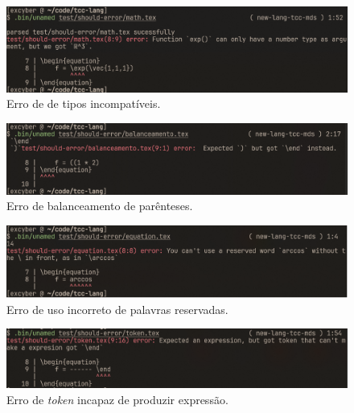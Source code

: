 \begin{figure}[H]
    \caption{\label{error-incompatible-types} \small Erro de de tipos incompatíveis.}
    \begin{center}
        \includegraphics[scale=0.5]{./Imagens/error-incompatible-types.png}
    \end{center}
\end{figure}


\begin{figure}[H]
    \caption{\label{error-balanceamento} \small Erro de balanceamento de parênteses.}
    \begin{center}
        \includegraphics[scale=0.5]{./Imagens/error-balanceamento.png}
    \end{center}
\end{figure}

\begin{figure}[H]
    \caption{\label{error-reserved-word} \small Erro de uso incorreto de palavras reservadas.}
    \begin{center}
        \includegraphics[scale=0.5]{./Imagens/error-reserved-word.png}
    \end{center}
\end{figure}


\begin{figure}[H]
    \caption{\label{error-cant-make-expression} \small Erro de \textit{token} incapaz de produzir expressão.}
    \begin{center}
        \includegraphics[scale=0.5]{./Imagens/error-cant-make-expression.png}
    \end{center}
\end{figure}



